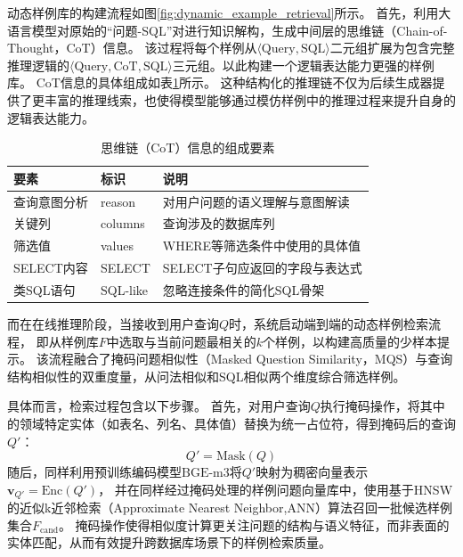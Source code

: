 动态样例库的构建流程如图\ref{fig:dynamic_example_retrieval}所示。
首先，利用大语言模型对原始的“问题-SQL”对进行知识解构，生成中间层的思维链（Chain-of-Thought，CoT）信息。
该过程将每个样例从$\langle \text{Query}, \text{SQL} \rangle$二元组扩展为包含完整推理逻辑的$\langle \text{Query}, \text{CoT}, \text{SQL} \rangle$三元组。以此构建一个逻辑表达能力更强的样例库。
CoT信息的具体组成如表\ref{tab:cot_components}所示。
这种结构化的推理链不仅为后续生成器提供了更丰富的推理线索，也使得模型能够通过模仿样例中的推理过程来提升自身的逻辑表达能力。

\begin{table}[htbp]
	\setlength{\abovecaptionskip}{5pt}
	\setlength{\belowcaptionskip}{5pt}
	\caption{思维链（CoT）信息的组成要素}
	\label{tab:cot_components}
	\centering
	\begin{tabular}{lll}
		\toprule
		要素 & 标识 & 说明 \\
		\midrule
		查询意图分析 & reason & 对用户问题的语义理解与意图解读 \\
		关键列 & columns & 查询涉及的数据库列 \\
		筛选值 & values & WHERE等筛选条件中使用的具体值 \\
		SELECT内容 & SELECT & SELECT子句应返回的字段与表达式 \\
		类SQL语句 & SQL-like & 忽略连接条件的简化SQL骨架 \\
		\bottomrule
	\end{tabular}
\end{table}
\par


而在在线推理阶段，当接收到用户查询$Q$时，系统启动端到端的动态样例检索流程，
即从样例库$F$中选取与当前问题最相关的$k$个样例，以构建高质量的少样本提示。
该流程融合了掩码问题相似性（Masked Question Similarity，MQS）\cite{gao2024text2sql}与查询结构相似性的双重度量，从问法相似和SQL相似两个维度综合筛选样例。

具体而言，检索过程包含以下步骤。
首先，对用户查询$Q$执行掩码操作，将其中的领域特定实体（如表名、列名、具体值）替换为统一占位符，得到掩码后的查询$Q'$：
\begin{equation}
Q' = \text{Mask}(Q)
\label{eq:mask_query}
\end{equation}
随后，同样利用预训练编码模型$\text{BGE-m3}$将$Q'$映射为稠密向量表示$\boldsymbol{v}_{Q'} = \text{Enc}(Q')$，
并在同样经过掩码处理的样例问题向量库中，使用基于HNSW的近似k近邻检索（Approximate Nearest Neighbor,ANN）算法召回一批候选样例集合$F_{\text{cand}}$。
掩码操作使得相似度计算更关注问题的结构与语义特征，而非表面的实体匹配，从而有效提升跨数据库场景下的样例检索质量。

